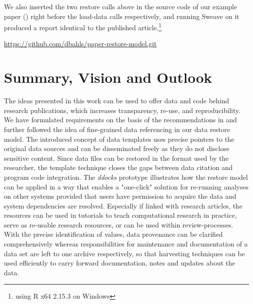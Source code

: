 \documentclass{acm_proc_article-sp}
\begin{document}
We also inserted the two restore calls above in the source code of our example paper (\cite{KoenkerZeileis2009}) right before the load-data calls respectively, and running Sweave on it produced a report identical to the published article.\footnote{using R x64 2.15.3 on Windows}


%
%
\url{https://github.com/dbahls/paper-restore-model.git}


\section{Summary, Vision and Outlook}\label{sec:outlook}


The ideas presented in this work can be used to offer data and code behind research publications, which increases transparency, re-use, and reproducibility.
We have formulated requirements on the basis of the recommendations in \cite{RePEc_ejw_journl_v_4_y_2007_i_3_p_326_337} and further followed the idea of fine-grained data referencing in our data restore model.
The introduced concept of data templates uses precise pointers to the original data sources and can be disseminated freely as they do not disclose sensitive content.
Since data files can be restored in the format used by the researcher, the template technique closes the gaps between data citation and program code integration.
The \textit{ddocks} prototype illustrates how the restore model can be applied in a way that enables a "one-click" solution for re-running analyses on other systems provided that users have permission to acquire the data and system dependencies are resolved.
Especially if linked with research articles, the resources can be used in tutorials to teach computational research in practice, serve as re-usable research resources, or can be used within review-processes.
With the precise identification of values, data provenance can be clarified comprehensively whereas responsibilities for maintenance and documentation of a data set are left to one archive respectively, so that harvesting techniques can be used efficiently to carry forward documentation, notes and updates about the data.
\end{document}
